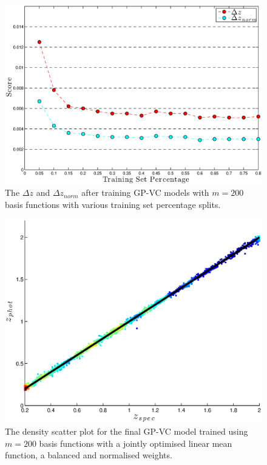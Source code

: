 \documentclass[useAMS,usenatbib,fleqn]{mn2e}
\begin{document}
\begin{figure}
       \centering
        \includegraphics[width=\columnwidth]{figures/percentage.eps}
        \caption{The $\Delta z$ and $\Delta z_{norm}$ after training GP-VC models with $m=200$ basis functions with various training set percentage splits. }
       \label{fig-training-percentage}
\end{figure}

\begin{figure}
       \centering
        \includegraphics[width=\columnwidth]{figures/final-model.eps}
        \caption{The density scatter plot for the final GP-VC model trained using $m=200$ basis functions with a jointly optimised linear mean function, a balanced and normalised weights. }
       \label{fig-final-model}
\end{figure}
\end{document}
